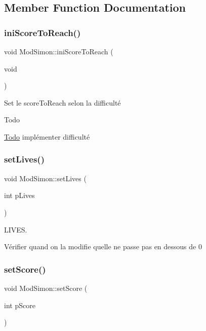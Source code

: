 \subsection{Member Function Documentation}
\mbox{\label{class_mod_simon_a01de269fc7beadbe1199c233ba24ada4}} 
\subsubsection{\texorpdfstring{ini\+Score\+To\+Reach()}{iniScoreToReach()}}
{\footnotesize\ttfamily void Mod\+Simon\+::ini\+Score\+To\+Reach (\begin{DoxyParamCaption}\item[{void}]{ }\end{DoxyParamCaption})}



Set le score\+To\+Reach selon la difficulté 

\begin{DoxyRefDesc}{Todo}
\item[\hyperlink{todo__todo000017}{Todo}]implémenter difficulté \end{DoxyRefDesc}
\mbox{\label{class_mod_simon_a8aa773733ce3e7cca012cf60383210aa}} 
\subsubsection{\texorpdfstring{set\+Lives()}{setLives()}}
{\footnotesize\ttfamily void Mod\+Simon\+::set\+Lives (\begin{DoxyParamCaption}\item[{int}]{p\+Lives }\end{DoxyParamCaption})}



L\+I\+V\+ES. 

Vérifier quand on la modifie qu\textquotesingle{}elle ne passe pas en dessous de 0 \mbox{\label{class_mod_simon_a5f019f6797813a9d2bd11c1e1692e1dd}} 
\subsubsection{\texorpdfstring{set\+Score()}{setScore()}}
{\footnotesize\ttfamily void Mod\+Simon\+::set\+Score (\begin{DoxyParamCaption}\item[{int}]{p\+Score }\end{DoxyParamCaption})}



